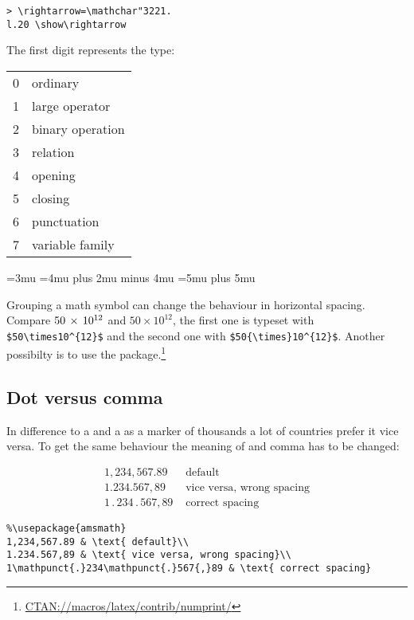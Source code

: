 \begin{table}[htb]
\begin{lstlisting}
> \rightarrow=\mathchar"3221.
l.20 \show\rightarrow
\end{lstlisting}

The first digit represents the type:

\begin{tabular}{l@{ : }l}
0 & ordinary\\
1 & large operator\\
2 & binary operation\\ 
3 & relation\\
4 & opening\\
5 & closing\\
6 & punctuation\\ 
7 & variable family
\end{tabular}


\begingroup
\thinmuskip=3mu
\medmuskip=4mu plus 2mu minus 4mu
\thickmuskip=5mu plus 5mu

\medskip
Grouping a math symbol can change the behaviour in horizontal spacing. Compare
$50\mkern\thinmuskip\times\mkern\thinmuskip10^{12}$ and $50{\times}10^{12}$, the first one is typeset with 
\verb+$50\times10^{12}$+ and the second one with \verb+$50{\times}10^{12}$+.
\endgroup
Another possibilty is to use the  package.\footnote{%
\href{ftp://ftp.dante.de/tex-archive/macros/latex/contrib/numprint/}%
{CTAN://macros/latex/contrib/numprint/}}

\subsection{Dot versus comma}\label{subsec:dot-comma}
%
In difference to a  and a  as a marker of thousands a lot of
countries prefer it vice versa. To get the same behaviour the meaning of  and
comma has to be changed:


\begin{align}
1,234,567.89 & \text{ default}\\
1.234.567,89 & \text{ vice versa, wrong spacing}\label{eq:comma}\\
1\mathpunct{.}234\mathpunct{.}567{,}89 & \text{ correct spacing}
\end{align}


\begin{lstlisting}
%\usepackage{amsmath}
1,234,567.89 & \text{ default}\\
1.234.567,89 & \text{ vice versa, wrong spacing}\\
1\mathpunct{.}234\mathpunct{.}567{,}89 & \text{ correct spacing}
\end{lstlisting}


\end{table}
